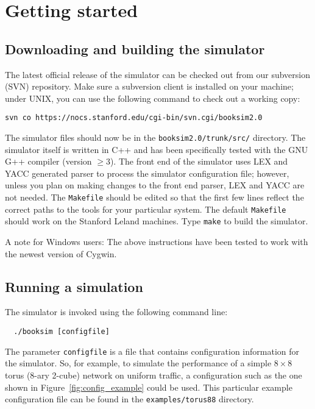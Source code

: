 \documentclass[11pt]{article}
\begin{document}
\section{Getting started}
\label{sec:get_started}

\subsection{Downloading and building the simulator}
\label{sec:download}

The latest official release of the simulator can be checked out from our subversion (SVN) repository. Make sure a subversion client is installed on your machine; under UNIX, you can use the following command to check out a working copy:

\begin{verbatim}
svn co https://nocs.stanford.edu/cgi-bin/svn.cgi/booksim2.0
\end{verbatim}

The simulator files should now be in the \texttt{booksim2.0/trunk/src/} directory.
The simulator itself is written in C++ and has been specifically tested with the GNU G++ compiler (version $\ge3$).
The front end of the simulator uses LEX and YACC generated parser to process the simulator configuration file; however, unless you plan on making changes to the front end parser, LEX and YACC are not needed.
The \texttt{Makefile} should be edited so that the first few lines reflect the correct paths to the tools for your particular system.
The default \texttt{Makefile} should work on the Stanford Leland machines.
Type \texttt{make} to build the simulator. 

A note for Windows users:
The above instructions have been tested to work with the newest version of Cygwin.

\subsection{Running a simulation}
\label{sec:run_example}

The simulator is invoked using the following command line:
\begin{verbatim}
  ./booksim [configfile]
\end{verbatim}

The parameter \texttt{configfile} is a file that contains configuration information for the simulator.
So, for example, to simulate the performance of a simple $8 \times 8$ torus (8-ary 2-cube) network on uniform traffic, a configuration such as the one shown in Figure~\ref{fig:config_example} could be used.
This particular example configuration file can be found in the \texttt{examples/torus88} directory.
\end{document}
